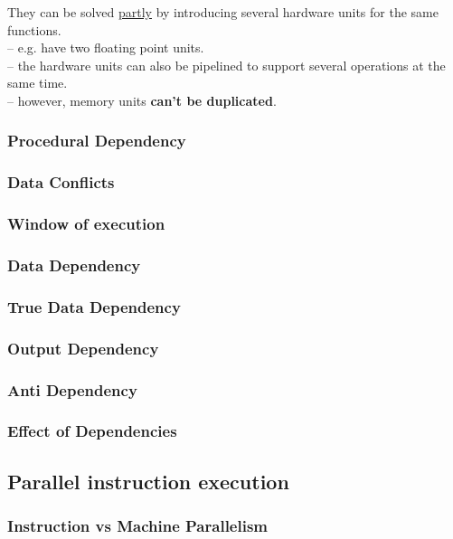 \documentclass[titlepage, a4paper]{article}
\begin{document}
They can be solved \underline{partly} by introducing several hardware units for the same functions. \\
-- e.g. have two floating point units. \\
-- the hardware units can also be pipelined to support several operations at the same time. \\
-- however, memory units \textbf{can't be duplicated}.

\subsubsection{Procedural Dependency}

\subsubsection{Data Conflicts}

\subsubsection{Window of execution}

\subsubsection{Data Dependency}

\subsubsection{True Data Dependency}

\subsubsection{Output Dependency}

\subsubsection{Anti Dependency}

\subsubsection{Effect of Dependencies}

\subsection{Parallel instruction execution}

\subsubsection{Instruction vs Machine Parallelism}
\end{document}
